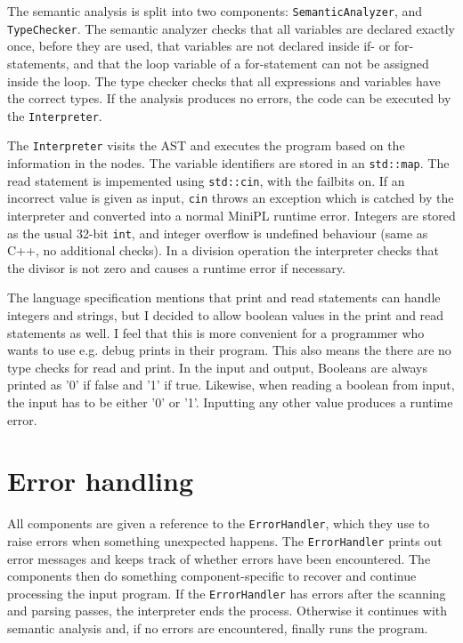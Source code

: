 \documentclass[a4paper]{article}
\newcommand*{\code}[1]{\texttt{#1}}
\begin{document}
The semantic analysis is split into 
two components: \code{SemanticAnalyzer}, and \code{TypeChecker}.
The semantic analyzer checks that all variables are declared 
exactly once, before they are used, that variables are not 
declared inside if- or for-statements, and that 
the loop variable of a for-statement can not be assigned 
inside the loop. The type checker checks that all expressions
and variables have the correct types. If the 
analysis produces no errors, the code can be executed by the 
\code{Interpreter}.

The \code{Interpreter} visits the AST and executes the 
program based on the information in the nodes. The 
variable identifiers are stored in an \code{std::map}.
The read statement is impemented 
using \code{std::cin}, with the failbits on. If an 
incorrect value is given as input, \code{cin} throws an 
exception which is catched by the interpreter and converted 
into a normal MiniPL runtime error.
Integers are stored as the usual 32-bit \code{int}, and 
integer overflow is undefined behaviour (same as C++, no 
additional checks).
In a division operation the interpreter checks that the 
divisor is not zero and causes a runtime error if necessary.


The language specification mentions that print and read 
statements can handle integers and strings, but
I decided to allow boolean values in the print and read 
statements as well. I feel that this is more convenient for 
a programmer who wants to use e.g. debug prints in their 
program.  This also means the there are no type checks 
for read and print. 
In the input and output, Booleans are always printed as 
'0' if false and '1' 
if true. Likewise, when reading a boolean from input, the 
input has to be either '0' or '1'. Inputting any other value 
produces a runtime error.



\section{Error handling}
\label{sect:errors}

All components are given a reference to the \code{ErrorHandler}, 
which they use to raise errors when something unexpected happens.
The \code{ErrorHandler} prints out error messages and keeps track 
of whether errors have been encountered. 
The components then do something component-specific to recover and 
continue processing the input program. If the \code{ErrorHandler} 
has errors after the scanning and parsing passes, the interpreter 
ends the process. Otherwise it continues with semantic analysis 
and, if no errors are encountered, finally runs the program.
\end{document}
